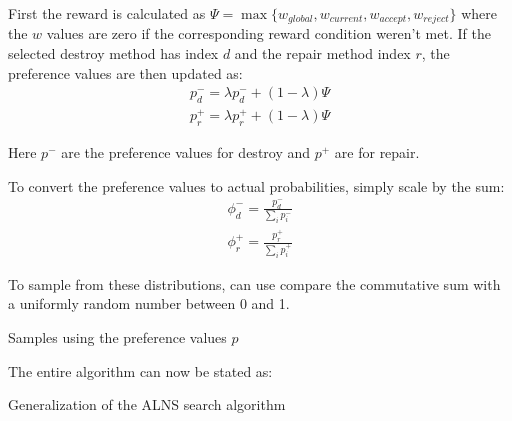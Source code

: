First the reward is calculated as $\Psi = \max\{w_{global}, w_{current}, w_{accept}, w_{reject}\}$ where the $w$ values are zero if the corresponding reward condition weren't met. If the selected destroy method has index $d$ and the repair method index $r$, the preference values are then updated as:
\begin{align}
p_d^- = \lambda p_d^- + (1 - \lambda)\Psi \\
p_r^+ = \lambda p_r^+ + (1 - \lambda)\Psi
\end{align}

Here $p^-$ are the preference values for destroy and $p^+$ are for repair.

To convert the preference values to actual probabilities, simply scale by the sum:
\begin{align}
\phi_d^- = \frac{p_d^-}{\sum_{i} p_i^-} \\
\phi_r^+ = \frac{p_r^+}{\sum_{i} p_i^+}
\end{align}

To sample from these distributions, can use compare the commutative sum with a uniformly random number between 0 and 1.

\begin{algorithm}[H]
  \caption{Samples using the preference values $p$}
  \begin{algorithmic}[1]
      \State {} 
    \EndFunction
  \end{algorithmic}
\end{algorithm}

The entire algorithm can now be stated as:

\begin{algorithm}[H]
  \caption{Generalization of the ALNS search algorithm}
  \begin{algorithmic}[1]
       
       
      \State
      \Repeat
      \State
      \State
      \EndIf
      \State {}
    \EndFunction
  \end{algorithmic}
\end{algorithm}


